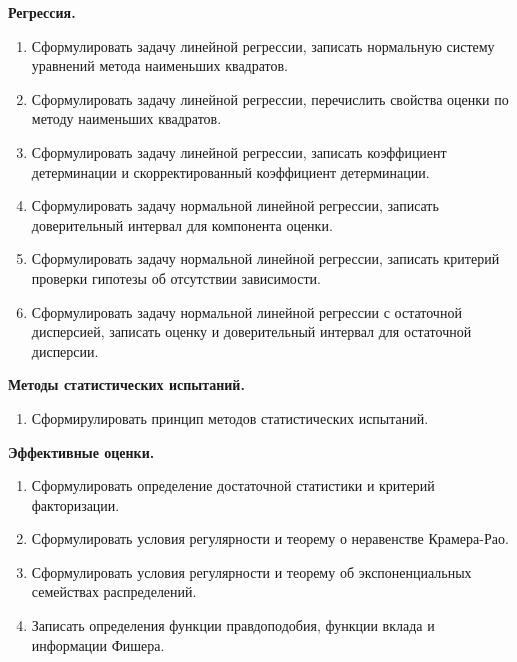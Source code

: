 \documentclass[a4paper,12pt]{article}
\newif\iftutor
\newcommand{\theme}[1]{\hfil \textbf{#1} \hfil}
\begin{document}
\theme{Регрессия.}
\begin{enumerate}[resume]
    \item Сформулировать задачу линейной регрессии, записать нормальную систему уравнений метода наименьших квадратов.
    \item Сформулировать задачу линейной регрессии, перечислить свойства оценки по методу наименьших квадратов.
    \item Сформулировать задачу линейной регрессии, записать коэффициент детерминации и скорректированный коэффициент детерминации.
    \item Сформулировать задачу нормальной линейной регрессии, записать доверительный интервал для компонента оценки.
    \item Сформулировать задачу нормальной линейной регрессии, записать критерий проверки гипотезы об отсутствии зависимости.
    \item Сформулировать задачу нормальной линейной регрессии с остаточной дисперсией, записать оценку и доверительный интервал для остаточной дисперсии.
\end{enumerate}

\theme{Методы статистических испытаний.}
\begin{enumerate}[resume]
    \item Сформирулировать принцип методов статистических испытаний.
\end{enumerate}

\theme{Эффективные оценки.}
\begin{enumerate}[resume]
    \item Сформулировать определение достаточной статистики и критерий факторизации.
    \item Сформулировать условия регулярности и теорему о неравенстве Крамера-Рао.
    \item Сформулировать условия регулярности и теорему об экспоненциальных семействах распределений.
    \item Записать определения функции правдоподобия, функции вклада и информации Фишера.
\end{enumerate}

\iftutor
\end{document}

